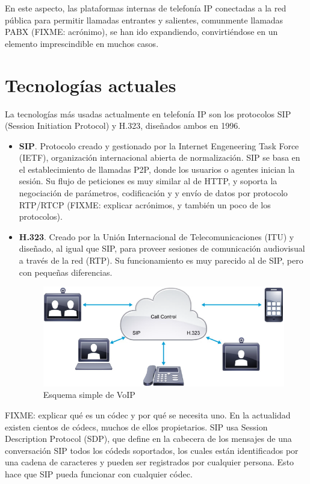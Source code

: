 \documentclass[a4paper, 12pt]{book}
\begin{document}
En este aspecto, las plataformas internas de telefonía IP conectadas a la red pública para permitir llamadas entrantes y salientes, comunmente llamadas PABX (FIXME: acrónimo), se han ido expandiendo, convirtiéndose en un elemento imprescindible en muchos casos. 

\section{Tecnologías actuales}
\label{sec:tecnologias-actuales}

La tecnologías más usadas actualmente en telefonía IP son los protocolos SIP (Session Initiation Protocol) y H.323, diseñados ambos en 1996.
\begin{itemize}
  \item  \textbf{SIP}. Protocolo creado y gestionado por la Internet Engeneering Task Force (IETF), organización internacional abierta de normalización. SIP se basa en el establecimiento de llamadas P2P, donde los usuarios o agentes inician la sesión. Su flujo de peticiones es muy similar al de HTTP, y soporta la negociación de parámetros, codificación y y envío de datos por protocolo RTP/RTCP (FIXME: explicar acrónimos, y también un poco de los protocolos).
  \item \textbf{H.323}. Creado por la Unión Internacional de Telecomunicaciones (ITU) y diseñado, al igual que SIP, para proveer sesiones de comunicación audiovisual a través de la red (RTP). Su funcionamiento es muy parecido al de SIP, pero con pequeñas diferencias.
  \\
  \begin{figure}[h]
    \centering
    \includegraphics{img/fig_diagrama_simple_collab}
    \caption{Esquema simple de VoIP}
    \label{figura:fig_diagrama_simple_collab}
  \end{figure}
\end{itemize}

FIXME: explicar qué es un códec y por qué se necesita uno. En la actualidad existen cientos de códecs, muchos de ellos propietarios. SIP usa Session Description Protocol (SDP), que define en la cabecera de los mensajes de una conversación SIP todos los códeds soportados, los cuales están identificados por una cadena de caracteres y pueden ser registrados por cualquier persona. Esto hace que SIP pueda funcionar con cualquier códec. 
\end{document}
